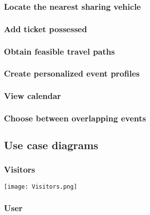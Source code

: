 	\subsubsection{Locate the nearest sharing vehicle}
			
		
	\subsubsection{Add ticket possessed}
			
	
	\subsubsection{Obtain feasible travel paths}
			
	
	\subsubsection{Create personalized event profiles}
		
		
	\subsubsection{View calendar}
		
	
	\subsubsection{Choose between overlapping events}
		
		
\subsection{Use case diagrams}
\label{subsect:Use case diagrams}
	\subsubsection{Visitors}
		\texttt{[image: Visitors.png]}
	\subsubsection{User}
		\noindent{}